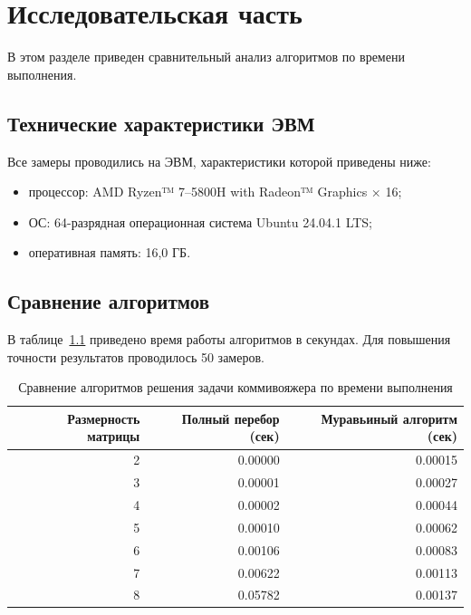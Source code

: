 \clearpage


\chapter{Исследовательская часть}\label{ch:-}
В этом разделе приведен сравнительный анализ алгоритмов по времени выполнения.


\section{Технические характеристики ЭВМ}\label{sec:--2}
Все замеры проводились на ЭВМ, характеристики которой приведены ниже:
\begin{itemize}
    \item процессор: AMD Ryzen™ 7--5800H with Radeon™ Graphics × 16;
    \item ОС: 64-разрядная операционная система Ubuntu 24.04.1 LTS;
    \item оперативная память: 16,0 ГБ.
\end{itemize}


\section{Сравнение алгоритмов}
В таблице~\ref{tbl:work_time} приведено время работы алгоритмов в секундах.
Для повышения точности результатов проводилось 50 замеров.

\begin{table}[h]
    \begin{center}
        \caption{\label{tbl:work_time} Сравнение алгоритмов решения задачи коммивояжера по времени выполнения}
        \begin{tabular}{|r|r|r|}
            \hline
            Размерность матрицы & Полный перебор (сек) & Муравьиный алгоритм (сек) \\ \hline
            2                   & 0.00000              & 0.00015                   \\ \hline
            3                   & 0.00001              & 0.00027                   \\ \hline
            4                   & 0.00002              & 0.00044                   \\ \hline
            5                   & 0.00010              & 0.00062                   \\ \hline
            6                   & 0.00106              & 0.00083                   \\ \hline
            7                   & 0.00622              & 0.00113                   \\ \hline
            8                   & 0.05782              & 0.00137                   \\ \hline
        \end{tabular}
    \end{center}
\end{table}

